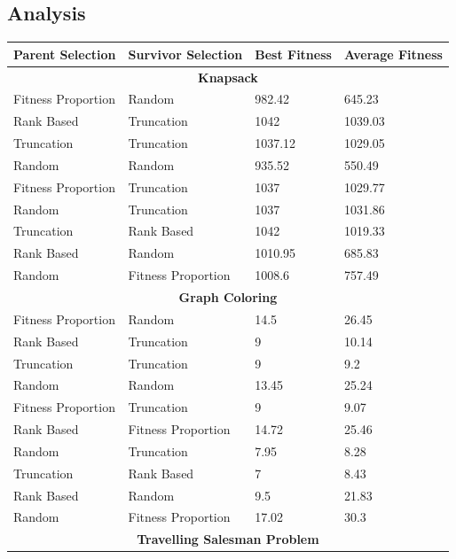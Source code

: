 \documentclass[11pt, letterpaper]{article}
\begin{document}
\subsection {Analysis}
\begin{table}[!ht]
    \centering
    \begin{tabular}{|l|l|l|l|}
    \hline
        \textbf{Parent Selection} & \textbf{Survivor Selection} & \textbf{Best Fitness} & \textbf{Average Fitness} \\ \hline
        \multicolumn{4}{|c|}{\textbf{Knapsack}} \\ \hline
        Fitness Proportion & Random & 982.42 & 645.23 \\ \hline
        Rank Based & Truncation & 1042 & 1039.03 \\ \hline
        Truncation & Truncation & 1037.12 & 1029.05 \\ \hline
        Random & Random & 935.52 & 550.49 \\ \hline
        Fitness Proportion & Truncation & 1037 & 1029.77 \\ \hline
        Random & Truncation & 1037 & 1031.86 \\ \hline
        Truncation & Rank Based & 1042 & 1019.33 \\ \hline
        Rank Based & Random & 1010.95 & 685.83 \\ \hline
        Random & Fitness Proportion & 1008.6 & 757.49 \\ \hline
        \multicolumn{4}{|c|}{\textbf{Graph Coloring}} \\ \hline
        Fitness Proportion & Random & 14.5 & 26.45 \\ \hline
        Rank Based & Truncation & 9 & 10.14 \\ \hline
        Truncation & Truncation & 9 & 9.2 \\ \hline
        Random & Random & 13.45 & 25.24 \\ \hline
        Fitness Proportion & Truncation & 9 & 9.07 \\ \hline
        Rank Based & Fitness Proportion & 14.72 & 25.46 \\ \hline
        Random & Truncation & 7.95 & 8.28 \\ \hline
        Truncation & Rank Based & 7 & 8.43 \\ \hline
        Rank Based & Random & 9.5 & 21.83 \\ \hline
        Random & Fitness Proportion & 17.02 & 30.3 \\ \hline
        \multicolumn{4}{|c|}{\textbf{Travelling Salesman Problem}} \\ \hline

\end{tabular}
\end{table}
\end{document}
